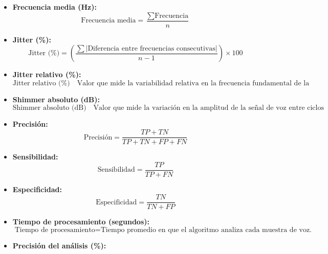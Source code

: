 \documentclass[listof=nochaptergap,12pt,times,authoryear]{report}
\begin{document}
\begin{itemize}
    \item \textbf{Frecuencia media (Hz):} 
    \begin{equation}
        \text{Frecuencia media} = \frac{\sum \text{Frecuencia}}{n} \tag{1}
    \end{equation}
    \item \textbf{Jitter (\%):} 
    \begin{equation}
        \text{Jitter (\%)} = \left(\frac{\sum \left|\text{Diferencia entre frecuencias consecutivas}\right|}{n-1} \right) \times 100 \tag{2}
    \end{equation}
    \item \textbf{Jitter relativo (\%):} 
    \begin{equation}
        \text{Jitter relativo (\%)} \quad \text{Valor que mide la variabilidad relativa en la frecuencia fundamental de la voz.} \tag{3}
    \end{equation}
    \item \textbf{Shimmer absoluto (dB):} 
    \begin{equation}
        \text{Shimmer absoluto (dB)} \quad \text{Valor que mide la variación en la amplitud de la señal de voz entre ciclos consecutivos.} \tag{4}
    \end{equation}
    \item \textbf{Precisión:} 
    \begin{equation}
        \text{Precisión} = \frac{TP + TN}{TP + TN + FP + FN} \tag{5}
    \end{equation}
    \item \textbf{Sensibilidad:} 
    \begin{equation}
        \text{Sensibilidad} = \frac{TP}{TP + FN} \tag{6}
    \end{equation}
    \item \textbf{Especificidad:} 
    \begin{equation}
        \text{Especificidad} = \frac{TN}{TN + FP} \tag{7}
    \end{equation}
    \item \textbf{Tiempo de procesamiento (segundos):} 
    \begin{equation}
        \text{Tiempo de procesamiento} = \text{Tiempo promedio en que el algoritmo analiza cada muestra de voz.} \tag{8}
    \end{equation}
    \item \textbf{Precisión del análisis (\%):} 
    \begin{equation}

\end{equation}
\end{itemize}
\end{document}
